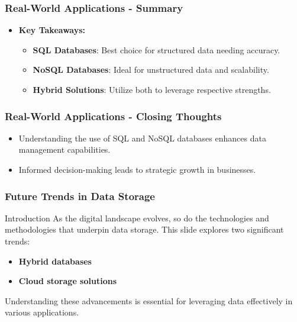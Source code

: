 \documentclass[aspectratio=169]{beamer}
\begin{document}
\begin{frame}[fragile]
    \frametitle{Real-World Applications - Summary}
    \begin{itemize}
        \item \textbf{Key Takeaways:}
            \begin{itemize}
                \item \textbf{SQL Databases}: Best choice for structured data needing accuracy.
                \item \textbf{NoSQL Databases}: Ideal for unstructured data and scalability.
                \item \textbf{Hybrid Solutions}: Utilize both to leverage respective strengths.
            \end{itemize}
    \end{itemize}
\end{frame}

\begin{frame}[fragile]
    \frametitle{Real-World Applications - Closing Thoughts}
    \begin{itemize}
        \item Understanding the use of SQL and NoSQL databases enhances data management capabilities.
        \item Informed decision-making leads to strategic growth in businesses.
    \end{itemize}
\end{frame}

\begin{frame}[fragile]
    \frametitle{Future Trends in Data Storage}
    \begin{block}{Introduction}
        As the digital landscape evolves, so do the technologies and methodologies that underpin data storage. This slide explores two significant trends: 
        \begin{itemize}
            \item \textbf{Hybrid databases}
            \item \textbf{Cloud storage solutions}
        \end{itemize}
        Understanding these advancements is essential for leveraging data effectively in various applications.
    \end{block}
\end{frame}
\end{document}
